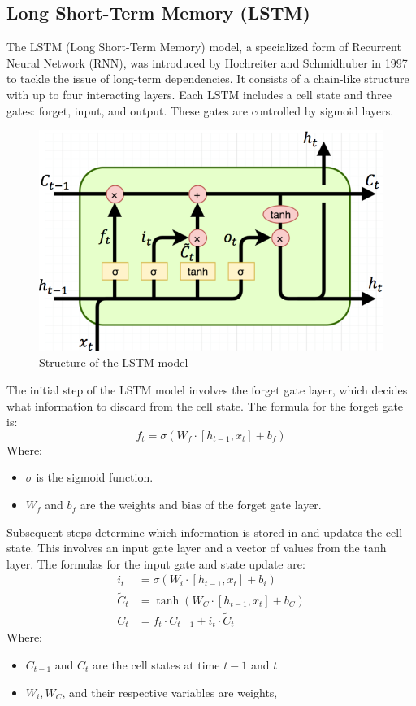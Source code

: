 \documentclass{ieeeojies}
\begin{document}
\subsection{Long Short-Term Memory (LSTM)} 
The LSTM (Long Short-Term Memory) model, a specialized form of Recurrent Neural Network (RNN), was introduced by Hochreiter and Schmidhuber in 1997 to tackle the issue of long-term dependencies. It consists of a chain-like structure with up to four interacting layers. Each LSTM includes a cell state and three gates: forget, input, and output. These gates are controlled by sigmoid layers.
\begin{figure}[H]
  \centering
  \begin{minipage}{0.8\linewidth}
    \centering
    \includegraphics[width=\linewidth]{Figure_algorithm/lstm (1).png}
    \caption{Structure of the LSTM model \cite{mlp_image}}
    \label{fig_mlp}
  \end{minipage}
\end{figure}
The initial step of the LSTM model involves the forget gate layer, which decides what information to discard from the cell state. The formula for the forget gate is:
\[ f_t = \sigma(W_f \cdot [h_{t-1}, x_t] + b_f) \]
Where:
\begin{itemize}
    \item \( \sigma \) is the sigmoid function.
    \item \( W_f \) and \( b_f \) are the weights and bias of the forget gate layer.
\end{itemize}

Subsequent steps determine which information is stored in and updates the cell state. This involves an input gate layer and a vector of values from the tanh layer. The formulas for the input gate and state update are:
\begin{align*}
    i_t & = \sigma(W_i \cdot [h_{t-1}, x_t] + b_i) \\
    \tilde{C}_t & = \tanh(W_C \cdot [h_{t-1}, x_t] + b_C) \\
    C_t & = f_t \cdot C_{t-1} + i_t \cdot \tilde{C}_t
\end{align*}
Where:
\begin{itemize}
    \item \( C_{t-1} \) and \( C_t \) are the cell states at time \( t-1 \) and \( t \)
    \item \( W_i, W_C \), and their respective variables are weights,
\end{itemize}
\end{document}
